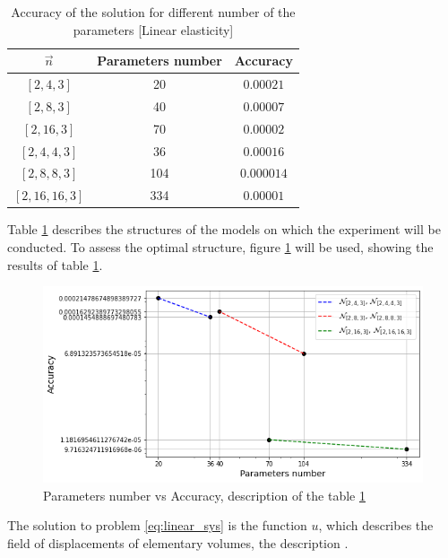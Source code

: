 \begin{table}
	\centering
	\begin{tabular}{| c | c | c |} 
	\hline
		$\vec{n}$ & Parameters number & Accuracy \\ \hline
		$[2, 4, 3]$ & 20 & $0.00021$ \\ \hline
		$[2, 8, 3]$ & 40 & $0.00007$ \\ \hline
		$[2, 16, 3]$ & 70 & $0.00002$ \\ \hline
		$[2, 4, 4, 3]$ & 36 & $0.00016$ \\ \hline
		$[2, 8, 8, 3]$ & 104 & $0.000014$ \\ \hline
		$[2, 16, 16, 3]$ & 334 & $0.00001$ \\ \hline
	\end{tabular}
	\caption{Accuracy of the solution for different number of the parameters [Linear elasticity]}
	\label{table:linear_tab}
\end{table}

Table \ref{table:linear_tab} describes the structures of the models on which the experiment will be conducted. To assess the optimal structure, figure \ref{fig:linear_param_vs_accuracy} will be used, showing the results of table \ref{table:linear_tab}.

\begin{figure}
	\centering
	\includegraphics[width=\textwidth]{images/chapter3/linear_param_vs_accuracy.png}
	\caption{Parameters number vs Accuracy, description of the table \ref{table:linear_tab}}
	\label{fig:linear_param_vs_accuracy}\tabularnewline
\end{figure}

 The solution to problem \eqref{eq:linear_sys} is the function $u$, which describes the field of displacements of elementary volumes, the description \cite{barber1992elasticity}.

